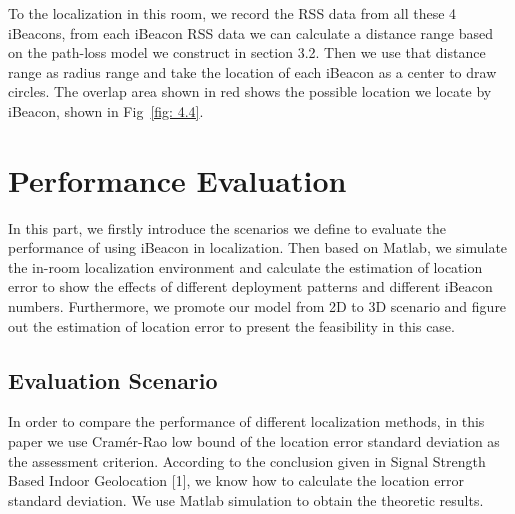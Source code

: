 \documentclass[12pt]{report}
\begin{document}
To the localization in this room, we record the RSS data from all these 4 iBeacons, from each iBeacon RSS data we can calculate a distance range based on the path-loss model we construct in section 3.2. Then we use that distance range as radius range and take the location of each iBeacon as a center to draw circles. The overlap area shown in red shows the possible location we locate by iBeacon, shown in Fig~\ref{fig: 4.4}.



\section{Performance Evaluation}
In this part, we firstly introduce the scenarios we define to evaluate the performance of using iBeacon in localization. Then based on Matlab, we simulate the in-room localization environment and calculate the estimation of location error to show the effects of different deployment patterns and different iBeacon numbers. Furthermore, we promote our model from 2D to 3D scenario and figure out the estimation of location error to present the feasibility in this case.

\subsection{Evaluation Scenario}
In order to compare the performance of different localization methods, in this paper we use Cramér-Rao low bound of the location error standard deviation as the assessment criterion. According to the conclusion given in Signal Strength Based Indoor Geolocation [1], we know how to calculate the location error standard deviation. We use Matlab simulation to obtain the theoretic results.
\end{document}
